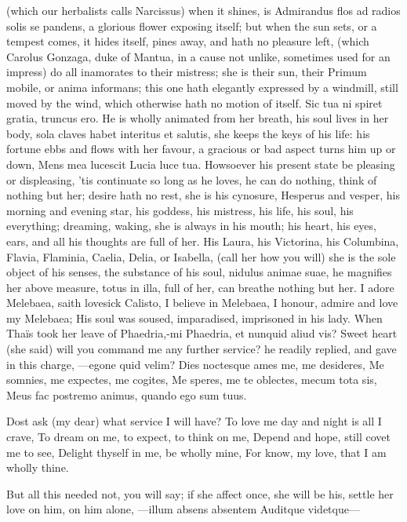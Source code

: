 {(which our herbalists calls Narcissus) when it shines, is Admirandus
flos ad radios solis se pandens, a glorious flower exposing itself;
but when the sun sets, or a tempest comes, it hides itself, pines
away, and hath no pleasure left, (which Carolus Gonzaga, duke of
Mantua, in a cause not unlike, sometimes used for an impress) do all
inamorates to their mistress; she is their sun, their Primum mobile, or
anima informans; this one hath elegantly expressed by a windmill,
still moved by the wind, which otherwise hath no motion of itself. Sic
tua ni spiret gratia, truncus ero. He is wholly animated from her
breath, his soul lives in her body, sola claves habet interitus
et salutis, she keeps the keys of his life: his fortune ebbs and flows
with her favour, a gracious or bad aspect turns him up or down, Mens
mea lucescit Lucia luce tua. Howsoever his present state be pleasing or
displeasing, 'tis continuate so long as he loves, he can do
nothing, think of nothing but her; desire hath no rest, she is his
cynosure, Hesperus and vesper, his morning and evening star, his
goddess, his mistress, his life, his soul, his everything; dreaming,
waking, she is always in his mouth; his heart, his eyes, ears, and all
his thoughts are full of her. His Laura, his Victorina, his Columbina,
Flavia, Flaminia, Caelia, Delia, or Isabella, (call her how you will)
she is the sole object of his senses, the substance of his soul,
nidulus animae suae, he magnifies her above measure, totus in illa,
full of her, can breathe nothing but her. I adore Melebaea, saith
lovesick Calisto, I believe in Melebaea, I honour, admire and
love my Melebaea; His soul was soused, imparadised, imprisoned in his
lady. When Thaïs took her leave of Phaedria,-mi Phaedria, et
nunquid aliud vis? Sweet heart (she said) will you command me any
further service? he readily replied, and gave in this charge,
---egone quid velim?
Dies noctesque ames me, me desideres,
Me somnies, me expectes, me cogites,
Me speres, me te oblectes, mecum tota sis,
Meus fac postremo animus, quando ego sum tuus.

Dost ask (my dear) what service I will have?
To love me day and night is all I crave,
To dream on me, to expect, to think on me,
Depend and hope, still covet me to see,
Delight thyself in me, be wholly mine,
For know, my love, that I am wholly thine.

But all this needed not, you will say; if she affect once, she will be
his, settle her love on him, on him alone,
---illum absens absentem
Auditque videtque---

}
